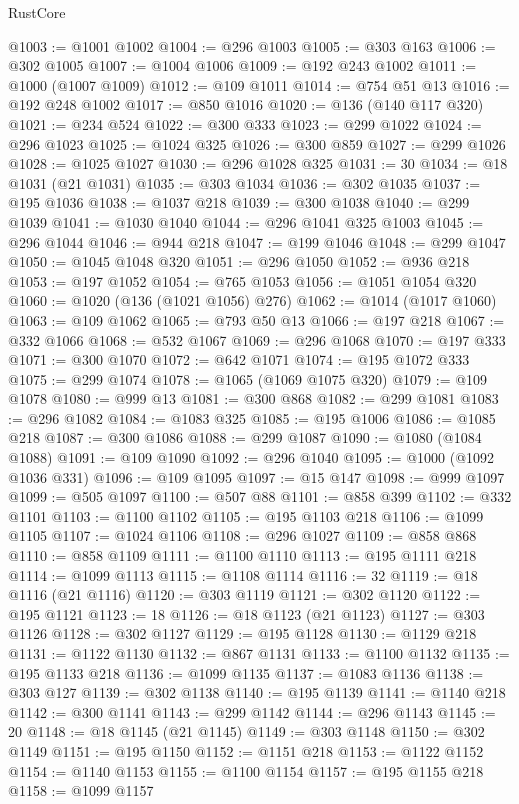 \begin{lexlean}{RustCore}
\begin{coremodule}
@1003 := @1001 @1002
@1004 := @296 @1003
@1005 := @303 @163
@1006 := @302 @1005
@1007 := @1004 @1006
@1009 := @192 @243 @1002
@1011 := @1000 (@1007 @1009)
@1012 := @109 @1011
@1014 := @754 @51 @13
@1016 := @192 @248 @1002
@1017 := @850 @1016
@1020 := @136 (@140 @117 @320)
@1021 := @234 @524
@1022 := @300 @333
@1023 := @299 @1022
@1024 := @296 @1023
@1025 := @1024 @325
@1026 := @300 @859
@1027 := @299 @1026
@1028 := @1025 @1027
@1030 := @296 @1028 @325
@1031 := 30
@1034 := @18 @1031 (@21 @1031)
@1035 := @303 @1034
@1036 := @302 @1035
@1037 := @195 @1036
@1038 := @1037 @218
@1039 := @300 @1038
@1040 := @299 @1039
@1041 := @1030 @1040
@1044 := @296 @1041 @325 @1003
@1045 := @296 @1044
@1046 := @944 @218
@1047 := @199 @1046
@1048 := @299 @1047
@1050 := @1045 @1048 @320
@1051 := @296 @1050
@1052 := @936 @218
@1053 := @197 @1052
@1054 := @765 @1053
@1056 := @1051 @1054 @320
@1060 := @1020 (@136 (@1021 @1056) @276)
@1062 := @1014 (@1017 @1060)
@1063 := @109 @1062
@1065 := @793 @50 @13
@1066 := @197 @218
@1067 := @332 @1066
@1068 := @532 @1067
@1069 := @296 @1068
@1070 := @197 @333
@1071 := @300 @1070
@1072 := @642 @1071
@1074 := @195 @1072 @333
@1075 := @299 @1074
@1078 := @1065 (@1069 @1075 @320)
@1079 := @109 @1078
@1080 := @999 @13
@1081 := @300 @868
@1082 := @299 @1081
@1083 := @296 @1082
@1084 := @1083 @325
@1085 := @195 @1006
@1086 := @1085 @218
@1087 := @300 @1086
@1088 := @299 @1087
@1090 := @1080 (@1084 @1088)
@1091 := @109 @1090
@1092 := @296 @1040
@1095 := @1000 (@1092 @1036 @331)
@1096 := @109 @1095
@1097 := @15 @147
@1098 := @999 @1097
@1099 := @505 @1097
@1100 := @507 @88
@1101 := @858 @399
@1102 := @332 @1101
@1103 := @1100 @1102
@1105 := @195 @1103 @218
@1106 := @1099 @1105
@1107 := @1024 @1106
@1108 := @296 @1027
@1109 := @858 @868
@1110 := @858 @1109
@1111 := @1100 @1110
@1113 := @195 @1111 @218
@1114 := @1099 @1113
@1115 := @1108 @1114
@1116 := 32
@1119 := @18 @1116 (@21 @1116)
@1120 := @303 @1119
@1121 := @302 @1120
@1122 := @195 @1121
@1123 := 18
@1126 := @18 @1123 (@21 @1123)
@1127 := @303 @1126
@1128 := @302 @1127
@1129 := @195 @1128
@1130 := @1129 @218
@1131 := @1122 @1130
@1132 := @867 @1131
@1133 := @1100 @1132
@1135 := @195 @1133 @218
@1136 := @1099 @1135
@1137 := @1083 @1136
@1138 := @303 @127
@1139 := @302 @1138
@1140 := @195 @1139
@1141 := @1140 @218
@1142 := @300 @1141
@1143 := @299 @1142
@1144 := @296 @1143
@1145 := 20
@1148 := @18 @1145 (@21 @1145)
@1149 := @303 @1148
@1150 := @302 @1149
@1151 := @195 @1150
@1152 := @1151 @218
@1153 := @1122 @1152
@1154 := @1140 @1153
@1155 := @1100 @1154
@1157 := @195 @1155 @218
@1158 := @1099 @1157

\end{coremodule}
\end{lexlean}
